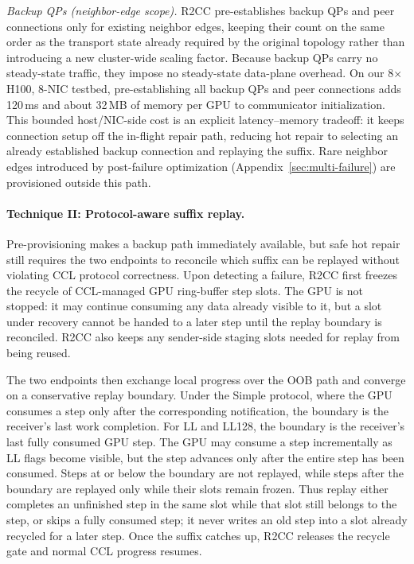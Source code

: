 \textit{Backup QPs (neighbor-edge scope).} R2CC pre-establishes backup QPs and peer connections only for existing neighbor edges, keeping their count on the same order as the transport state already required by the original topology rather than introducing a new cluster-wide scaling factor. Because backup QPs carry no steady-state traffic, they impose no steady-state data-plane overhead. On our 8$\times$H100, 8-NIC testbed, pre-establishing all backup QPs and peer connections adds 120\,ms and about 32\,MB of memory per GPU to communicator initialization. This bounded host/NIC-side cost is an explicit latency--memory tradeoff: it keeps connection setup off the in-flight repair path, reducing hot repair to selecting an already established backup connection and replaying the suffix. Rare neighbor edges introduced by post-failure optimization (Appendix~\ref{sec:multi-failure}) are provisioned outside this path.

\paragraph{Technique II: Protocol-aware suffix replay.} Pre-provisioning makes a backup path immediately available, but safe hot repair still requires the two endpoints to reconcile which suffix can be replayed without violating CCL protocol correctness. Upon detecting a failure, R2CC first freezes the recycle of CCL-managed GPU ring-buffer step slots. The GPU is not stopped: it may continue consuming any data already visible to it, but a slot under recovery cannot be handed to a later step until the replay boundary is reconciled. R2CC also keeps any sender-side staging slots needed for replay from being reused.

The two endpoints then exchange local progress over the OOB path and converge on a conservative replay boundary. Under the Simple protocol, where the GPU consumes a step only after the corresponding notification, the boundary is the receiver's last work completion. For LL and LL128, the boundary is the receiver's last fully consumed GPU step. The GPU may consume a step incrementally as LL flags become visible, but the step advances only after the entire step has been consumed. Steps at or below the boundary are not replayed, while steps after the boundary are replayed only while their slots remain frozen. Thus replay either completes an unfinished step in the same slot while that slot still belongs to the step, or skips a fully consumed step; it never writes an old step into a slot already recycled for a later step. Once the suffix catches up, R2CC releases the recycle gate and normal CCL progress resumes.

